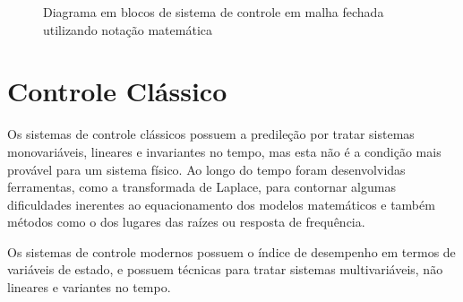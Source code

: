 \begin{figure}[!htb]
\centering
{}
\caption{ Diagrama em blocos de sistema de controle em malha fechada utilizando notação matemática}
\label{fig:malhaFechadaLetras}
\end{figure}



\section{Controle Clássico}

Os sistemas de controle clássicos possuem a predileção por tratar sistemas monovariáveis, lineares e invariantes no tempo, mas esta não é a condição mais provável para um sistema físico. Ao longo do tempo foram desenvolvidas ferramentas, como a transformada de Laplace, para contornar algumas dificuldades inerentes ao equacionamento dos modelos matemáticos e também métodos como o dos lugares das raízes ou resposta de frequência.

Os sistemas de controle modernos possuem o índice de desempenho em termos de variáveis de estado, e possuem técnicas para tratar sistemas multivariáveis, não lineares e variantes no tempo.

